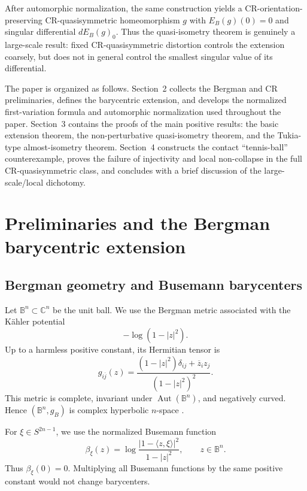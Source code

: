 \documentclass[11pt]{article}
\theoremstyle{definition}
\theoremstyle{remark}
\theoremstyle{definition}
\newcommand{\B}{\mathbb B}
\newcommand{\C}{\mathbb C}
\newcommand{\Aut}{\operatorname{Aut}}
\begin{document}
After automorphic normalization, the same construction yields a
CR-orientation-preserving CR-quasisymmetric homeomorphism \(g\) with
\(E_B(g)(0)=0\) and singular differential \(dE_B(g)_0\).  Thus the
quasi-isometry theorem is genuinely a large-scale result: fixed
CR-quasisymmetric distortion controls the extension coarsely, but does not in
general control the smallest singular value of its differential.

The paper is organized as follows.  Section~2 collects the Bergman and CR
preliminaries, defines the barycentric extension, and develops the normalized
first-variation formula and automorphic normalization used throughout the
paper.  Section~3 contains the proofs of the main positive results: the basic
extension theorem, the non-perturbative quasi-isometry theorem, and the
Tukia-type almost-isometry theorem.  Section~4 constructs the contact
``tennis-ball'' counterexample, proves the failure of injectivity and local
non-collapse in the full CR-quasisymmetric class, and concludes with a brief
discussion of the large-scale/local dichotomy.



\section{Preliminaries and the Bergman barycentric extension}
\label{section-preliminaries}

\subsection{Bergman geometry and Busemann barycenters}

Let \(\B^n\subset\C^n\) be the unit ball.  We use the Bergman metric associated
with the K\"ahler potential
\[
        -\log(1-|z|^2).
\]
Up to a harmless positive constant, its Hermitian tensor is
\begin{equation}\label{bergman-tensor}
        g_{i\overline j}(z)=
        \frac{(1-|z|^2)\delta_{ij}+\overline z_i z_j}{(1-|z|^2)^2}.
\end{equation}
This metric is complete, invariant under \(\Aut(\B^n)\), and negatively
curved.  Hence \((\B^n,g_B)\) is complex hyperbolic \(n\)-space
\cite{Goldman}.

For \(\xi\in S^{2n-1}\), we use the normalized Busemann function
\begin{equation}\label{busemann-function}
        \beta_\xi(z)=
        \log\frac{|1-\langle z,\xi\rangle|^2}{1-|z|^2},
        \qquad z\in\B^n.
\end{equation}
Thus \(\beta_\xi(0)=0\).  Multiplying all Busemann functions by the same
positive constant would not change barycenters.
\end{document}
